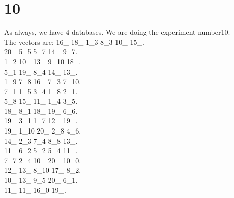 \chapter{10}
\indent As always, we have 4 databases. We are doing the experiment number10.\\
The vectors are:
16\_ 18\_ 1\_3 8\_3 10\_ 15\_.\\20\_ 5\_5 5\_7 14\_ 9\_7.\\1\_2 10\_ 13\_ 9\_10 18\_.\\5\_1 19\_ 8\_4 14\_ 13\_.\\1\_9 7\_8 16\_ 7\_3 7\_10.\\7\_1 1\_5 3\_4 1\_8 2\_1.\\5\_8 15\_ 11\_ 1\_4 3\_5.\\18\_ 8\_1 18\_ 19\_ 6\_6.\\19\_ 3\_1 1\_7 12\_ 19\_.\\19\_ 1\_10 20\_ 2\_8 4\_6.\\14\_ 2\_3 7\_4 8\_8 13\_.\\11\_ 6\_2 5\_2 5\_4 11\_.\\7\_7 2\_4 10\_ 20\_ 10\_0.\\12\_ 13\_ 8\_10 17\_ 8\_2.\\10\_ 13\_ 9\_5 20\_ 6\_1.\\11\_ 11\_ 16\_0 19\_.\\